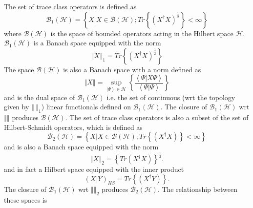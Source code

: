 \documentclass[aps,preprint]{revtex4}%
\begin{document}
The set of trace class operators is defined as
\begin{equation}
\mathcal{B}_{1}\left(  \mathcal{H}\right)  =\left\{  X|X\in\mathcal{B}\left(
\mathcal{H}\right)  ;Tr\left\{  \left(  X^{\dagger}X\right)  ^{\frac{1}{2}%
}\right\}  <\infty\right\}
\end{equation}
where $\mathcal{B}\left(  \mathcal{H}\right)  $ is the space of bounded
operators acting in the Hilbert space $\mathcal{H}$. $\mathcal{B}_{1}\left(
\mathcal{H}\right)  $ is a Banach space equipped with the norm
\begin{equation}
\left\Vert X\right\Vert _{1}=Tr\left\{  \left(  X^{\dagger}X\right)
^{\frac{1}{2}}\right\}
\end{equation}
The space $\mathcal{B}\left(  \mathcal{H}\right)  $ is also a Banach space
with a norm defined as
\begin{equation}
\left\Vert X\right\Vert =\sup_{\left\vert \Psi\right\rangle \in\mathcal{H}%
}\left\{  \frac{\left\langle \Psi|X\Psi\right\rangle }{\left\langle \Psi
|\Psi\right\rangle }\right\}
\end{equation}
and is the dual space of $\mathcal{B}_{1}\left(  \mathcal{H}\right)  $ i.e.
the set of continuous (wrt the topology given by $\left\Vert \ \right\Vert
_{1}$) linear functionals defined on $\mathcal{B}_{1}\left(  \mathcal{H}%
\right)  $. The closure of $\mathcal{B}_{1}\left(  \mathcal{H}\right)  $ wrt
$\left\Vert {}\right\Vert $ produces $\mathcal{B}\left(  \mathcal{H}\right)
.$ The set of trace class operators is also a subset of the set of
Hilbert-Schmidt operators, which is defined as
\begin{equation}
\mathcal{B}_{2}\left(  \mathcal{H}\right)  =\left\{  X|X\in\mathcal{B}\left(
\mathcal{H}\right)  ;Tr\left\{  \left(  X^{\dagger}X\right)  \right\}
<\infty\right\}
\end{equation}
and is also a Banach space equipped with the norm
\begin{equation}
\left\Vert X\right\Vert _{2}=\left\{  Tr\left(  X^{\dagger}X\right)  \right\}
^{\frac{1}{2}}.
\end{equation}
and in fact a Hilbert space equipped with the inner product
\begin{equation}
\left(  X|Y\right)  _{HS}=Tr\left\{  \left(  X^{\dagger}Y\right)  \right\}  .
\end{equation}
The closure of $\mathcal{B}_{1}\left(  \mathcal{H}\right)  $ wrt $\left\Vert
{}\right\Vert _{2}$ produces $\mathcal{B}_{2}\left(  \mathcal{H}\right)  $.
The relationship between these spaces is
\end{document}
